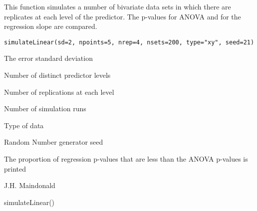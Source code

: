 \begin{Description}\relax
This function simulates a number of bivariate data sets
in which there are replicates at each level of the predictor.
The p-values for ANOVA and for the regression slope are 
compared.
\end{Description}
\begin{Usage}
\begin{verbatim}
simulateLinear(sd=2, npoints=5, nrep=4, nsets=200, type="xy", seed=21)
\end{verbatim}
\end{Usage}
\begin{Arguments}
\begin{ldescription}
\item[\code{sd}] The error standard deviation
\item[\code{npoints}] Number of distinct predictor levels
\item[\code{nrep}] Number of replications at each level
\item[\code{nsets}] Number of simulation runs
\item[\code{type}] Type of data
\item[\code{seed}] Random Number generator seed
\end{ldescription}
\end{Arguments}
\begin{Value}
The proportion of regression p-values that are less than the ANOVA p-values is
printed
\end{Value}
\begin{Author}\relax
J.H. Maindonald
\end{Author}
\begin{Examples}
\begin{ExampleCode}
simulateLinear()
\end{ExampleCode}
\end{Examples}

